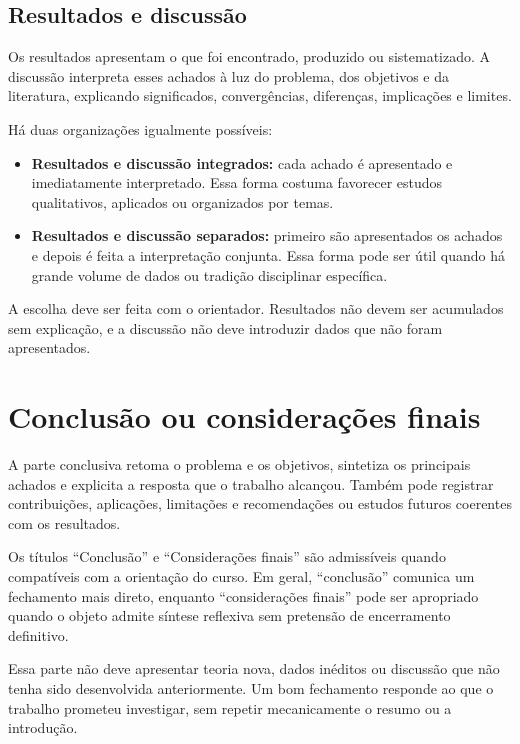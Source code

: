 \subsection{Resultados e discussão}

Os resultados apresentam o que foi encontrado, produzido ou sistematizado. A discussão interpreta esses achados à luz do problema, dos objetivos e da literatura, explicando significados, convergências, diferenças, implicações e limites.

Há duas organizações igualmente possíveis:

\begin{itemize}
  \item \textbf{Resultados e discussão integrados:} cada achado é apresentado e imediatamente interpretado. Essa forma costuma favorecer estudos qualitativos, aplicados ou organizados por temas.
  \item \textbf{Resultados e discussão separados:} primeiro são apresentados os achados e depois é feita a interpretação conjunta. Essa forma pode ser útil quando há grande volume de dados ou tradição disciplinar específica.
\end{itemize}

A escolha deve ser feita com o orientador. Resultados não devem ser acumulados sem explicação, e a discussão não deve introduzir dados que não foram apresentados.

\section{Conclusão ou considerações finais}

A parte conclusiva retoma o problema e os objetivos, sintetiza os principais achados e explicita a resposta que o trabalho alcançou. Também pode registrar contribuições, aplicações, limitações e recomendações ou estudos futuros coerentes com os resultados.

Os títulos ``Conclusão'' e ``Considerações finais'' são admissíveis quando compatíveis com a orientação do curso. Em geral, ``conclusão'' comunica um fechamento mais direto, enquanto ``considerações finais'' pode ser apropriado quando o objeto admite síntese reflexiva sem pretensão de encerramento definitivo.

Essa parte não deve apresentar teoria nova, dados inéditos ou discussão que não tenha sido desenvolvida anteriormente. Um bom fechamento responde ao que o trabalho prometeu investigar, sem repetir mecanicamente o resumo ou a introdução.
